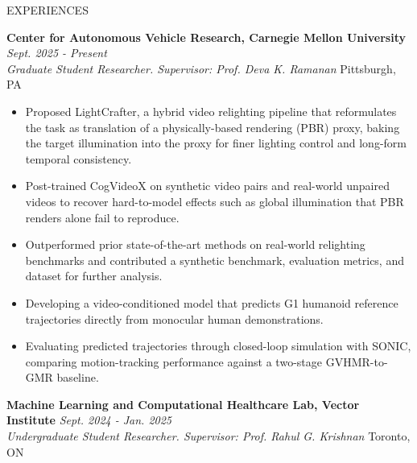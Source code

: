 \documentclass{resume} %
\begin{document}
\begin{rSection}{EXPERIENCES}

{\bf Center for Autonomous Vehicle Research, Carnegie Mellon University} \hfill {\em Sept. 2025 - Present} 
\\{\textit{Graduate Student Researcher. Supervisor: Prof. Deva K. Ramanan} \hfill {Pittsburgh, PA}}
\begin{itemize}
    \vspace{-0.2cm}\item Proposed LightCrafter, a hybrid video relighting pipeline that reformulates the task as translation of a physically-based rendering (PBR) proxy, baking the target illumination into the proxy for finer lighting control and long-form temporal consistency.
    \vspace{-0.2cm}\item Post-trained CogVideoX on synthetic video pairs and real-world unpaired videos to recover hard-to-model effects such as global illumination that PBR renders alone fail to reproduce.
    \vspace{-0.2cm}\item Outperformed prior state-of-the-art methods on real-world relighting benchmarks and contributed a synthetic benchmark, evaluation metrics, and dataset for further analysis.
    \vspace{-0.2cm}\item Developing a video-conditioned model that predicts G1 humanoid reference trajectories directly from monocular human demonstrations.
    \vspace{-0.2cm}\item Evaluating predicted trajectories through closed-loop simulation with SONIC, comparing motion-tracking performance against a two-stage GVHMR-to-GMR baseline.
\end{itemize}

{\bf Machine Learning and Computational Healthcare Lab, Vector Institute} \hfill {\em Sept. 2024 - Jan. 2025} 
\\{\textit{Undergraduate Student Researcher. Supervisor: Prof. Rahul G. Krishnan} \hfill {Toronto, ON}}


\end{rSection}
\end{document}
